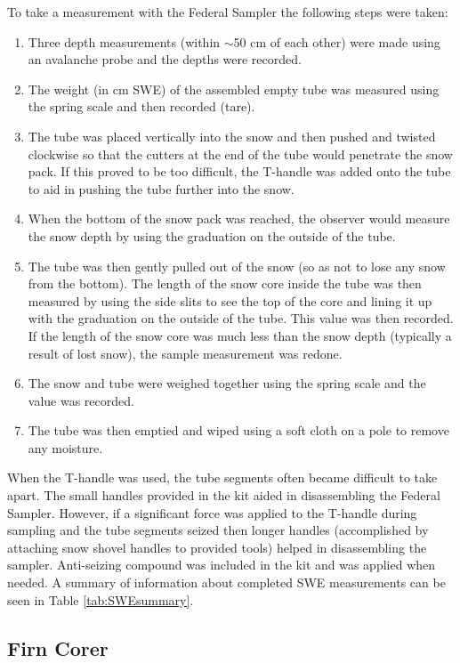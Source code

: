 \documentclass{sfuthesis}
\begin{document}
To take a measurement with the Federal Sampler the following steps were taken:
\begin{enumerate}
\item Three depth measurements (within $\sim$50 cm of each other) were made using an avalanche probe and the depths were recorded.
\item The weight (in cm SWE) of the assembled empty tube was measured using the spring scale and then recorded (tare).
\item The tube was placed vertically into the snow and then pushed and twisted clockwise so that the cutters at the end of the tube would penetrate the snow pack. If this proved to be too difficult, the T-handle was added onto the tube to aid in pushing the tube further into the snow. 
\item When the bottom of the snow pack was reached, the observer would measure the snow depth by using the graduation on the outside of the tube.
\item The tube was then gently pulled out of the snow (so as not to lose any snow from the bottom). The length of the snow core inside the tube was then measured by using the side slits to see the top of the core and lining it up with the graduation on the outside of the tube. This value was then recorded. If the length of the snow core was much less than the snow depth (typically a result of lost snow), the sample measurement was redone.
\item The snow and tube were weighed together using the spring scale and the value was recorded.
\item The tube was then emptied and wiped using a soft cloth on a pole to remove any moisture. 
\end{enumerate}

When the T-handle was used, the tube segments often became difficult to take apart. The small handles provided in the kit aided in disassembling the Federal Sampler. However, if a significant force was applied to the T-handle during sampling and the tube segments seized then longer handles (accomplished by attaching snow shovel handles to provided tools) helped in disassembling the sampler. Anti-seizing compound was included in the kit and was applied when needed. A summary of information about completed SWE measurements can be seen in Table \ref{tab:SWEsummary}.

\subsection{Firn Corer}
\end{document}
